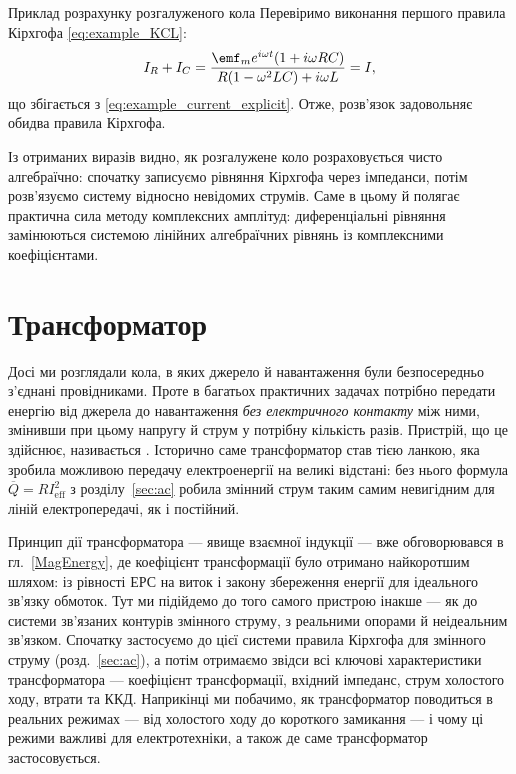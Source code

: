 \begin{Example}{Приклад розрахунку розгалуженого кола}
Перевіримо виконання першого правила Кірхгофа \eqref{eq:example_KCL}:
\begin{equation*}
	I_R + I_C = \frac{\emf_m e^{i\omega t}(1 + i\omega RC)}{R(1 - \omega^2 LC) + i\omega L} = I,
\end{equation*}
що збігається з \eqref{eq:example_current_explicit}. Отже, розв'язок задовольняє обидва правила Кірхгофа.

Із отриманих виразів видно, як розгалужене коло розраховується чисто алгебраїчно: спочатку записуємо рівняння Кірхгофа через імпеданси, потім розв'язуємо систему відносно невідомих струмів. Саме в цьому й полягає практична сила методу комплексних амплітуд: диференціальні рівняння замінюються системою лінійних алгебраїчних рівнянь із комплексними коефіцієнтами.
\end{Example}

\section{Трансформатор}\hypertarget{transformer}{}
\label{sec:transformer}

Досі ми розглядали кола, в яких джерело й навантаження були
безпосередньо з'єднані провідниками. Проте в багатьох практичних
задачах потрібно передати енергію від джерела до навантаження
\emph{без електричного контакту} між ними, змінивши при цьому
напругу й струм у потрібну кількість разів. Пристрій, що це
здійснює, називається . Історично саме
трансформатор став тією ланкою, яка зробила можливою передачу
електроенергії на великі відстані: без нього формула
$\overline{Q}=RI_{\text{eff}}^2$ з розділу~\ref{sec:ac} робила
змінний струм таким самим невигідним для ліній електропередачі,
як і постійний.

Принцип дії трансформатора --- явище взаємної індукції --- вже
обговорювався в гл.~\ref{MagEnergy}, де коефіцієнт трансформації
було отримано найкоротшим шляхом: із рівності ЕРС на виток і
закону збереження енергії для ідеального зв'язку обмоток. Тут
ми підійдемо до того самого пристрою інакше --- як до системи
зв'язаних контурів змінного струму, з реальними опорами й
неідеальним зв'язком. Спочатку застосуємо до цієї системи правила
Кірхгофа для змінного струму (розд.~\ref{sec:ac}), а потім
отримаємо звідси всі ключові характеристики трансформатора ---
коефіцієнт трансформації, вхідний імпеданс, струм холостого
ходу, втрати та ККД. Наприкінці ми побачимо, як трансформатор
поводиться в реальних режимах --- від холостого ходу до
короткого замикання --- і чому ці режими важливі для
електротехніки, а також де саме трансформатор застосовується.

